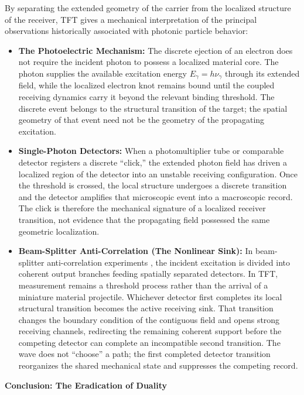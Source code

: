 \noindent By separating the extended geometry of the carrier from the localized structure of the receiver, TFT gives a mechanical interpretation of the principal observations historically associated with photonic particle behavior:
\begin{itemize}
    \item \textbf{The Photoelectric Mechanism:}
    The discrete ejection of an electron does not require the incident photon to possess a localized material core. The photon supplies the available excitation energy $E_\gamma=h\nu_\gamma$ through its extended field, while the localized electron knot remains bound until the coupled receiving dynamics carry it beyond the relevant binding threshold. The discrete event belongs to the structural transition of the target; the spatial geometry of that event need not be the geometry of the propagating excitation.

    \item \textbf{Single-Photon Detectors:}
    When a photomultiplier tube or comparable detector registers a discrete ``click,'' the extended photon field has driven a localized region of the detector into an unstable receiving configuration. Once the threshold is crossed, the local structure undergoes a discrete transition and the detector amplifies that microscopic event into a macroscopic record. The click is therefore the mechanical signature of a localized receiver transition, not evidence that the propagating field possessed the same geometric localization.

    \item \textbf{Beam-Splitter Anti-Correlation (The Nonlinear Sink):}
    In beam-splitter anti-correlation experiments \cite{Grangier_1986}, the incident excitation is divided into coherent output branches feeding spatially separated detectors. In TFT, measurement remains a threshold process rather than the arrival of a miniature material projectile. Whichever detector first completes its local structural transition becomes the active receiving sink. That transition changes the boundary condition of the contiguous field and opens strong receiving channels, redirecting the remaining coherent support before the competing detector can complete an incompatible second transition. The wave does not ``choose'' a path; the first completed detector transition reorganizes the shared mechanical state and suppresses the competing record.
\end{itemize}

\vspace{0.5em}
\noindent\textbf{Conclusion: The Eradication of Duality}

